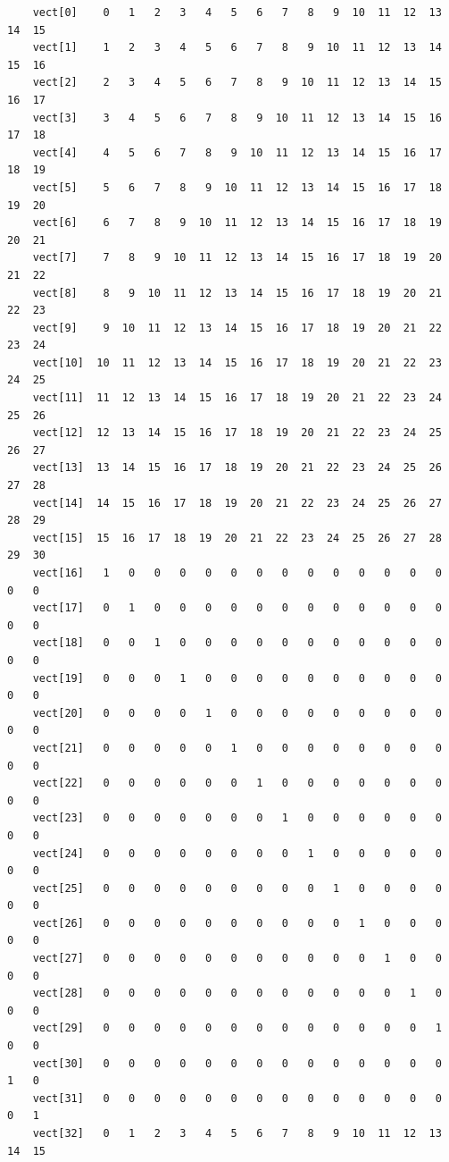 \begin{exemplu}
{\small
\begin{verbatim}
    vect[0]    0   1   2   3   4   5   6   7   8   9  10  11  12  13  14  15
    vect[1]    1   2   3   4   5   6   7   8   9  10  11  12  13  14  15  16
    vect[2]    2   3   4   5   6   7   8   9  10  11  12  13  14  15  16  17
    vect[3]    3   4   5   6   7   8   9  10  11  12  13  14  15  16  17  18
    vect[4]    4   5   6   7   8   9  10  11  12  13  14  15  16  17  18  19
    vect[5]    5   6   7   8   9  10  11  12  13  14  15  16  17  18  19  20
    vect[6]    6   7   8   9  10  11  12  13  14  15  16  17  18  19  20  21
    vect[7]    7   8   9  10  11  12  13  14  15  16  17  18  19  20  21  22
    vect[8]    8   9  10  11  12  13  14  15  16  17  18  19  20  21  22  23
    vect[9]    9  10  11  12  13  14  15  16  17  18  19  20  21  22  23  24
    vect[10]  10  11  12  13  14  15  16  17  18  19  20  21  22  23  24  25
    vect[11]  11  12  13  14  15  16  17  18  19  20  21  22  23  24  25  26
    vect[12]  12  13  14  15  16  17  18  19  20  21  22  23  24  25  26  27
    vect[13]  13  14  15  16  17  18  19  20  21  22  23  24  25  26  27  28
    vect[14]  14  15  16  17  18  19  20  21  22  23  24  25  26  27  28  29
    vect[15]  15  16  17  18  19  20  21  22  23  24  25  26  27  28  29  30
    vect[16]   1   0   0   0   0   0   0   0   0   0   0   0   0   0   0   0
    vect[17]   0   1   0   0   0   0   0   0   0   0   0   0   0   0   0   0
    vect[18]   0   0   1   0   0   0   0   0   0   0   0   0   0   0   0   0
    vect[19]   0   0   0   1   0   0   0   0   0   0   0   0   0   0   0   0
    vect[20]   0   0   0   0   1   0   0   0   0   0   0   0   0   0   0   0
    vect[21]   0   0   0   0   0   1   0   0   0   0   0   0   0   0   0   0
    vect[22]   0   0   0   0   0   0   1   0   0   0   0   0   0   0   0   0
    vect[23]   0   0   0   0   0   0   0   1   0   0   0   0   0   0   0   0
    vect[24]   0   0   0   0   0   0   0   0   1   0   0   0   0   0   0   0
    vect[25]   0   0   0   0   0   0   0   0   0   1   0   0   0   0   0   0
    vect[26]   0   0   0   0   0   0   0   0   0   0   1   0   0   0   0   0
    vect[27]   0   0   0   0   0   0   0   0   0   0   0   1   0   0   0   0
    vect[28]   0   0   0   0   0   0   0   0   0   0   0   0   1   0   0   0
    vect[29]   0   0   0   0   0   0   0   0   0   0   0   0   0   1   0   0
    vect[30]   0   0   0   0   0   0   0   0   0   0   0   0   0   0   1   0
    vect[31]   0   0   0   0   0   0   0   0   0   0   0   0   0   0   0   1
    vect[32]   0   1   2   3   4   5   6   7   8   9  10  11  12  13  14  15

\end{verbatim}}
\end{exemplu}
